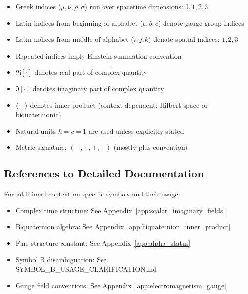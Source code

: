 \begin{itemize}
\item Greek indices ($\mu, \nu, \rho, \sigma$) run over spacetime dimensions: $0,1,2,3$
\item Latin indices from beginning of alphabet ($a, b, c$) denote gauge group indices
\item Latin indices from middle of alphabet ($i, j, k$) denote spatial indices: $1,2,3$
\item Repeated indices imply Einstein summation convention
\item $\Re[\cdot]$ denotes real part of complex quantity
\item $\Im[\cdot]$ denotes imaginary part of complex quantity
\item $\langle \cdot, \cdot \rangle$ denotes inner product (context-dependent: Hilbert space or biquaternionic)
\item Natural units $\hbar = c = 1$ are used unless explicitly stated
\item Metric signature: $(-,+,+,+)$ (mostly plus convention)
\end{itemize}

\subsection{References to Detailed Documentation}

For additional context on specific symbols and their usage:
\begin{itemize}
\item Complex time structure: See Appendix~\ref{app:scalar_imaginary_fields}
\item Biquaternion algebra: See Appendix~\ref{app:biquaternion_inner_product}
\item Fine-structure constant: See Appendix~\ref{app:alpha_status}
\item Symbol B disambiguation: See SYMBOL\_B\_USAGE\_CLARIFICATION.md
\item Gauge field conventions: See Appendix~\ref{app:electromagnetism_gauge}
\end{itemize}
